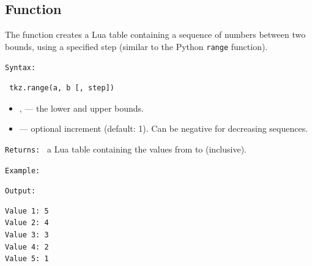\subsection{Function }
\label{sub:tkz_range}

The  function creates a Lua table containing a sequence of numbers
between two bounds, using a specified step (similar to the Python \texttt{range} function).

\texttt{Syntax: }
\begin{verbatim}
 tkz.range(a, b [, step])
\end{verbatim}

\begin{itemize}
  \item {},  — the lower and upper bounds.
  \item {} — optional increment (default: 1).
        Can be negative for decreasing sequences.
\end{itemize}

\texttt{Returns: } a Lua table  containing the values from  to  (inclusive).

\medskip
\texttt{Example: }
\begin{tkzexample}
\end{tkzexample}

\texttt{Output: }
\begin{verbatim}
Value 1: 5
Value 2: 4
Value 3: 3
Value 4: 2
Value 5: 1
\end{verbatim}

\endinput